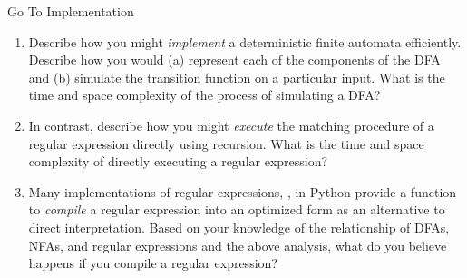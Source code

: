 \documentclass[11pt]{book}
\begin{document}
\newpage


\begin{problem}{Go To Implementation \turninproblem{}}

\begin{enumerate}[label=(\alph*)]
  \item Describe how you might \emph{implement} a deterministic finite automata efficiently.
    Describe how you would (a) represent each of the components of the DFA and (b) simulate the transition function on a particular input.
    What is the time and space complexity of the process of simulating a DFA?
  \item In contrast, describe how you might \emph{execute} the matching procedure of a regular expression directly using recursion.
    What is the time and space complexity of directly executing a regular expression?
  \item Many implementations of regular expressions, \eg, in Python provide a function to \emph{compile} a regular expression into an optimized form as an alternative to direct interpretation.
    Based on your knowledge of the relationship of DFAs, NFAs, and regular expressions and the above analysis, what do you believe happens if you compile a regular expression?
\end{enumerate}

\end{problem}
\end{document}

